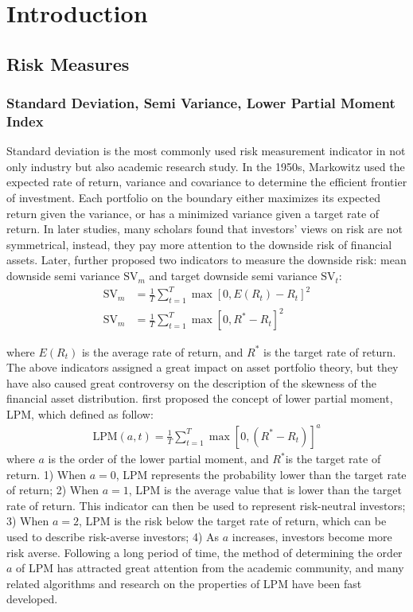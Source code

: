 \section{Introduction}
\subsection{Risk Measures}
\subsubsection{Standard Deviation, Semi Variance, Lower Partial Moment Index}
Standard deviation is the most commonly used risk measurement indicator in not only industry but also academic research study. In the 1950s, Markowitz used the expected rate of return, variance and covariance to determine the efficient frontier of investment. Each portfolio on the boundary either maximizes its expected return given the variance, or has a minimized variance given a target rate of return. In later studies, many scholars found that investors' views on risk are not symmetrical, instead, they pay more attention to the downside risk of financial assets. Later, \cite{MH1991} further proposed two indicators to measure the downside risk: mean downside semi variance $\text{SV}_{m}$ and target downside semi variance $\text{SV}_{t}$:
\begin{equation}
\begin{aligned}
    \text{SV}_{m} &= \frac{1}{T} \sum_{t=1}^T \max \left[0, E(R_{t})-R_{t}\right]^2 \\
    \text{SV}_{m} &=\frac{1}{T} \sum_{t=1}^T \max \left[0, R^*-R_t\right]^2
\end{aligned}        
\end{equation}

\noindent 
where $E(R_{t})$ is the average rate of return, and $R^*$ is the target rate of return.
The above indicators assigned a great impact on asset portfolio theory, but they have also caused great controversy on the description of the skewness of the financial asset distribution.
\cite{BV1975} first proposed the concept of lower partial moment, LPM, which defined as follow:
\begin{equation}
 \begin{aligned}
    \text{LPM}(a, t)=\frac{1}{T} \sum_{t=1}^T \max \left[0,\left(R^*-R_t\right)\right]^a
\end{aligned}       
\end{equation}
\noindent 
where $a$ is the order of the lower partial moment, and $R^*$is the target rate of return. 1) When $a=0$, LPM represents the probability lower than the target rate of return; 2) When $a=1$, LPM is the average value that is lower than the target rate of return. This indicator can then be used to represent risk-neutral investors; 3) When $a=2$, LPM is the risk below the target rate of return, which can be used to describe risk-averse investors; 4) As $a$ increases, investors become more risk averse. Following a long period of time, the method of determining the order $a$ of LPM has attracted great attention from the academic community, and many related algorithms and research on the properties of LPM have been fast developed.

